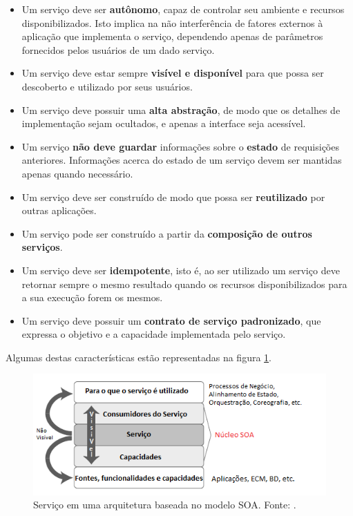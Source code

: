 \begin{itemize}
\item Um serviço deve ser \textbf{autônomo},  capaz de controlar seu ambiente e recursos disponibilizados. Isto implica na não interferência de fatores externos à aplicação que implementa o serviço, dependendo apenas de parâmetros fornecidos pelos usuários de um dado serviço.

\item Um serviço deve estar sempre \textbf{visível e disponível} para que possa ser descoberto e utilizado por seus usuários.

\item Um serviço deve possuir uma \textbf{alta abstração}, de modo que os detalhes de implementação sejam ocultados, e apenas a interface seja acessível.

\item Um serviço \textbf{não deve guardar} informações sobre o \textbf{estado} de requisições anteriores. Informações acerca do estado de um serviço devem ser mantidas apenas quando necessário.

\item Um serviço deve ser construído de modo que possa ser \textbf{reutilizado} por outras aplicações.

\item Um serviço pode ser construído a partir da \textbf{composição de outros serviços}.

\item Um serviço deve ser \textbf{idempotente}, isto é, ao ser utilizado um serviço deve retornar sempre o mesmo resultado quando os recursos disponibilizados para a sua execução forem os mesmos.

\item Um serviço deve possuir um \textbf{contrato de serviço padronizado}, que expressa o objetivo e a capacidade implementada pelo serviço.
\end{itemize}

Algumas destas características estão representadas na figura \ref{servico_na_arquitetura}.

\begin{figure}[htb]
\centering
\includegraphics[scale=0.8]{figuras/servico_na_arquitetura.png}
\caption{Serviço em uma arquitetura baseada no modelo SOA. Fonte: \cite{nickull_service_2007}.}
\label{servico_na_arquitetura}
\end{figure}

